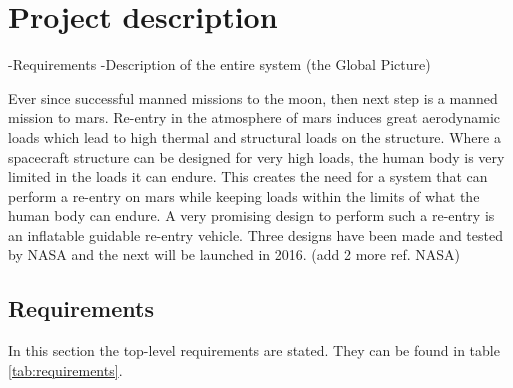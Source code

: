 \section{Project description}\label{cha:project_description}%
-Requirements
-Description of the entire system (the Global Picture)

Ever since successful manned missions to the moon, then next step is a manned mission to mars. Re-entry in the atmosphere of mars induces great aerodynamic loads which lead to high thermal and structural loads on the structure. Where a spacecraft structure can be designed for very high loads, the human body is very limited in the loads it can endure. This creates the need for a system that can perform a re-entry on mars while keeping loads within the limits of what the human body can endure. A very promising design to perform such a re-entry is an inflatable guidable re-entry vehicle. Three designs have been made and tested by NASA and the next will be launched in 2016. \cite{irve2}(add 2 more ref. NASA) 

\subsection{Requirements}
In this section the top-level requirements are stated. They can be found in table \ref{tab:requirements}.

